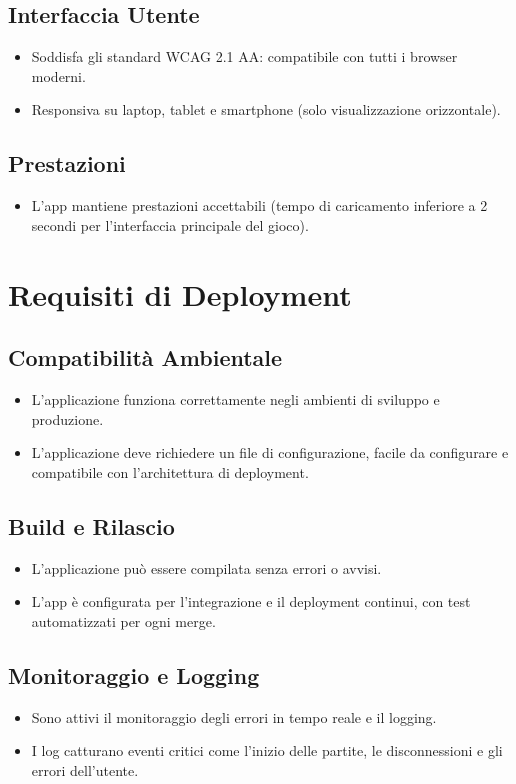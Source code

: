 \documentclass{article}
\begin{document}
\subsection{Interfaccia Utente}
\begin{itemize}
    \item Soddisfa gli standard WCAG 2.1 AA: compatibile con tutti i browser moderni.
    \item Responsiva su laptop, tablet e smartphone (solo visualizzazione orizzontale).
\end{itemize}

\subsection{Prestazioni}
\begin{itemize}
    \item L'app mantiene prestazioni accettabili (tempo di caricamento inferiore a 2 secondi per l'interfaccia principale del gioco).
\end{itemize}

\section{Requisiti di Deployment}

\subsection{Compatibilità Ambientale}
\begin{itemize}
    \item L'applicazione funziona correttamente negli ambienti di sviluppo e produzione.
    \item L'applicazione deve richiedere un file di configurazione, facile da configurare e compatibile con l'architettura di deployment.
\end{itemize}

\subsection{Build e Rilascio}
\begin{itemize}
    \item L'applicazione può essere compilata senza errori o avvisi.
    \item L'app è configurata per l'integrazione e il deployment continui, con test automatizzati per ogni merge.
\end{itemize}

\subsection{Monitoraggio e Logging}
\begin{itemize}
    \item Sono attivi il monitoraggio degli errori in tempo reale e il logging.
    \item I log catturano eventi critici come l'inizio delle partite, le disconnessioni e gli errori dell'utente.
\end{itemize}
\end{document}
